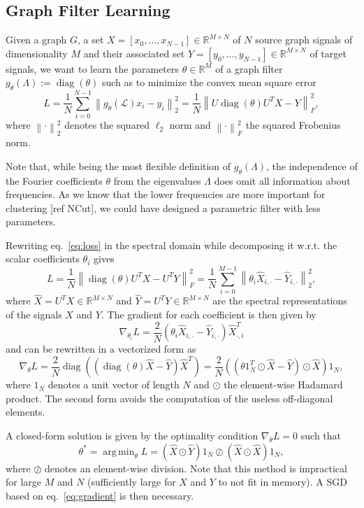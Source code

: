 \documentclass{article}
\DeclareMathOperator*{\diag}{diag}
\DeclareMathOperator*{\argmin}{arg\,min}
\renewcommand{\L}{\mathcal{L}}
\newcommand{\R}{\mathbb{R}}
\newcommand{\Xh}{\hat{X}}
\newcommand{\Yh}{\hat{Y}}
\newcommand{\norm}[1]{\left\| #1 \right\|}
\begin{document}
\subsection{Graph Filter Learning}\label{graph-filter-learning}

Given a graph \(G\), a set
\(X = [x_0, \ldots, x_{N-1}] \in \R^{M \times N}\) of \(N\) source graph
signals of dimensionality \(M\) and their associated set
\(Y = [y_0, \ldots, y_{N-1}] \in \R^{M \times N}\) of target signals, we
want to learn the parameters \(\theta \in \R^M\) of a graph filter
\(g_\theta(\Lambda) := \diag(\theta)\) such as to minimize the convex
mean square error \begin{equation} L =
\frac{1}{N} \sum_{i=0}^{N-1} \norm{ g_\theta(\L) x_i - y_i }_2^2 =
\frac{1}{N} \norm{ U \diag(\theta) U^T X - Y }_F^2, \label{eq:loss}\end{equation}
where \(\norm{\cdot}_2^2\) denotes the squared \(\ell_2\) norm and
\(\norm{\cdot}_F^2\) the squared Frobenius norm.

Note that, while being the most flexible definition of
\(g_\theta(\Lambda)\), the independence of the Fourier coefficients
\(\theta\) from the eigenvalues \(\Lambda\) does omit all information
about frequencies. As we know that the lower frequencies are more
important for clustering {[}ref NCut{]}, we could have designed a
parametric filter with less parameters.

Rewriting eq.~\ref{eq:loss} in the spectral domain while decomposing it
w.r.t. the scalar coefficients \(\theta_i\) gives \[ L =
\frac{1}{N} \norm{ \diag(\theta) U^T X - U^T Y }_F^2 =
\frac{1}{N} \sum_{i=0}^{M-1} \norm{\theta_i\Xh_{i,\cdot}-\Yh_{i,\cdot}}_2^2, \]
where \(\Xh = U^TX \in \R^{M \times N}\) and
\(\Yh = U^TY \in \R^{M \times N}\) are the spectral representations of
the signals \(X\) and \(Y\). The gradient for each coefficient is then
given by \[ \nabla_{\theta_i} L =
\frac{2}{N} ( \theta_i \Xh_{i,\cdot} - \Yh_{i,\cdot} ) \Xh^T_{\cdot,i} \]
and can be rewritten in a vectorized form as
\begin{equation} \nabla_{\theta} L =
\frac{2}{N} \diag \left( (\diag(\theta) \Xh - \Yh) \Xh^T \right) =
\frac{2}{N} \left( ( \theta 1_N^T \odot \Xh - \Yh ) \odot \Xh \right) 1_N,
\label{eq:gradient}\end{equation} where \(1_N\) denotes a unit vector of
length \(N\) and \(\odot\) the element-wise Hadamard product. The second
form avoids the computation of the useless off-diagonal elements.

A closed-form solution is given by the optimality condition
\(\nabla_{\theta}L=0\) such that
\begin{equation} \theta^* = \argmin_\theta L =
(\Xh \odot \Yh) 1_N \oslash (\Xh \odot \Xh) 1_N, \label{eq:direct}\end{equation}
where \(\oslash\) denotes an element-wise division. Note that this
method is impractical for large \(M\) and \(N\) (sufficiently large for
\(X\) and \(Y\) to not fit in memory). A \gls{SGD} based on
eq.~\ref{eq:gradient} is then necessary.
\end{document}
